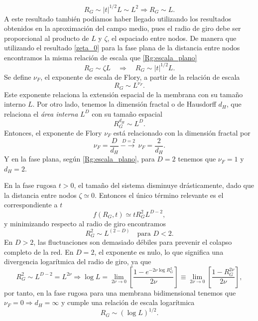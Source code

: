 \begin{equation}\label{Rg:escala_plano}
R_G\sim |t|^{1/2}L\sim L^2 \Rightarrow R_G\sim L.
\end{equation}
A este resultado también podíamos haber llegado utilizando los resultados
obtenidos en la aproximación del campo medio, pues el radio de giro debe ser
proporcional al producto de $L$ y $\zeta$, el espaciado entre
nodos. De manera que utilizando el resultado \eqref{zeta_0} para la fase plana
de la distancia entre nodos encontramos la misma relación de escala que \eqref{Rg:escala_plano}
\begin{equation}
R_G\sim \zeta L \quad \Rightarrow \quad R_G\sim |t|^{1/2}L.
\end{equation}
Se define $\nu_F$, el exponente de escala de Flory, a partir de la relación de
escala
\begin{equation}
 R_G\sim L^{\nu_F}. 
\end{equation}
Este exponente relaciona la extensión espacial de la membrana con su tamaño
interno $L$. Por otro lado, tenemos la dimensión fractal o de Hausdorff $d_H$,
que relaciona el \textit{área interna} $L^D$ con su tamaño espacial
\begin{equation}
R_G^{d_H}\sim L^D.
\end{equation} 
Entonces, el exponente de Flory $\nu_F$ está relacionado con la dimensión
fractal por
\begin{equation}
 \nu_F=\frac{D}{d_H}\ \stackrel{D=2}{-\!\!\!\longrightarrow}\ \nu_F=\frac{2}{d_H}.
\end{equation}
Y en la fase plana, según \eqref{Rg:escala_plano}, para $D=2$ tenemos que
$\nu_F=1$ y $d_H=2$.


En la fase rugosa $t>0$, el tamaño del sistema disminuye drásticamente, dado que la distancia
entre nodos $\zeta\simeq 0$. Entonces el único término relevante es el correspondiente a $t$
\begin{equation}
f(R_G,t)\simeq t R_G^2 L^{D-2}, 
\end{equation}
y minimizando respecto al radio de giro encontramos
\begin{equation}
R_G^2\sim L^{(2-D)} \quad \text{para } D<2.
\end{equation}
En $D>2$, las fluctuaciones son demasiado débiles para prevenir el colapso
completo de la red. En $D=2$, el exponente es nulo, lo que significa una
divergencia logarítmica del radio de giro, ya que
\begin{equation}
R_G^2\sim L^{D-2}=L^{2\nu}\Rightarrow \log L=\lim_{2\nu\rightarrow
  0}\left[\frac{1-e^{-2\nu\log R^2_G}}{2\nu}\right]\equiv\lim_{2\nu\rightarrow
  0}\left[\frac{1-R^{2\nu}_G}{2\nu}\right],
\end{equation}
por tanto, en la fase rugosa para una membrana bidimensional tenemos que
$\nu_F=0\Rightarrow d_H=\infty$ y cumple una relación de escala logarítmica  
\begin{equation}
R_G\sim(\log L)^{1/2}.
\end{equation}

